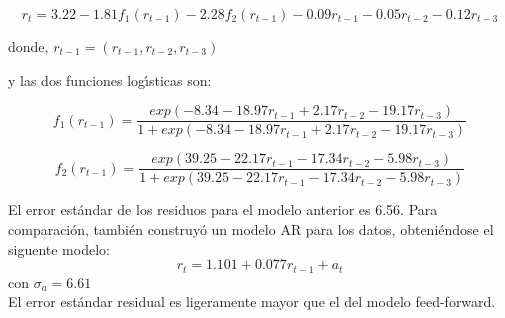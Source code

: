 \begin{equation*} 
	r_t = 3.22 - 1.81 f_1 (r_{t-1}) - 2.28 f_2 (r_{t-1}) - 0.09 r_{t-1} - 0.05r_{t-2} - 0.12r_{t-3} 
	\end{equation*}
	
	donde, $r_{t-1} = (r_{t-1},r_{t-2},r_{t-3})$ 

	
	y las dos funciones log\'{\i}sticas son:
	
	\begin{equation*} 
	f_1(r_{t-1}) = \frac { exp (-8.34 -18.97r_{t-1} + 2.17 r_{t-2} -19.17 r_{t-3})}{1 + exp(-8.34 -18.97r_{t-1} + 2.17 r_{t-2} -19.17 r_{t-3})}  
	\end{equation*}
	
	\begin{equation*} 
	f_2(r_{t-1}) = \frac { exp (39.25 -22.17 r_{t-1} - 17.34 r_{t-2} -5.98 r_{t-3})}{1 + exp (39.25 -22.17 r_{t-1} - 17.34 r_{t-2} -5.98 r_{t-3})}  
	\end{equation*}
	
	El error est\'andar de los residuos para el modelo anterior es 6.56. Para comparaci\'on, tambi\'en construy\'o un modelo AR para los datos, obteni\'endose el siguente modelo:\\
	\begin{equation*}
	r_t = 1.101 + 0.077r_{t -1} + a_t
	\end{equation*}
	con $\sigma_a = 6.61$\\
	El error est\'andar residual es ligeramente mayor que el del modelo feed-forward.

